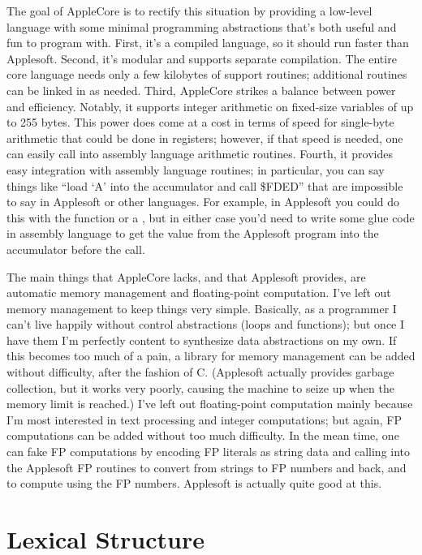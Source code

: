 \documentclass[10pt]{article}
\begin{document}
The goal of AppleCore is to rectify this situation by providing a
low-level language with some minimal programming abstractions that's
both useful and fun to program with.  First, it's a compiled language,
so it should run faster than Applesoft.  Second, it's modular and
supports separate compilation. The entire core language needs only a
few kilobytes of support routines; additional routines can be linked
in as needed.  Third, AppleCore strikes a balance between power and
efficiency.  Notably, it supports integer arithmetic on fixed-size
variables of up to 255 bytes.  This power does come at a cost in terms
of speed for single-byte arithmetic that could be done in registers;
however, if that speed is needed, one can easily call into assembly
language arithmetic routines.  Fourth, it provides easy integration
with assembly language routines; in particular, you can say things
like ``load `A' into the accumulator and call \$FDED'' that are
impossible to say in Applesoft or other languages.  For example, in
Applesoft you could do this with the  function or a
, but in either case you'd need to write some glue code in
assembly language to get the value from the Applesoft program into the
accumulator before the call.

The main things that AppleCore lacks, and that Applesoft provides, are
automatic memory management and floating-point computation.  I've left
out memory management to keep things very simple.  Basically, as a
programmer I can't live happily without control abstractions (loops
and functions); but once I have them I'm perfectly content to
synthesize data abstractions on my own.  If this becomes too much of a
pain, a library for memory management can be added without difficulty,
after the fashion of C.  (Applesoft actually provides garbage
collection, but it works very poorly, causing the machine to seize up
when the memory limit is reached.)  I've left out floating-point
computation mainly because I'm most interested in text processing and
integer computations; but again, FP computations can be added without
too much difficulty.  In the mean time, one can fake FP computations
by encoding FP literals as string data and calling into the Applesoft
FP routines to convert from strings to FP numbers and back, and to
compute using the FP numbers.  Applesoft is actually quite good at
this.

\section{Lexical Structure}
\end{document}
